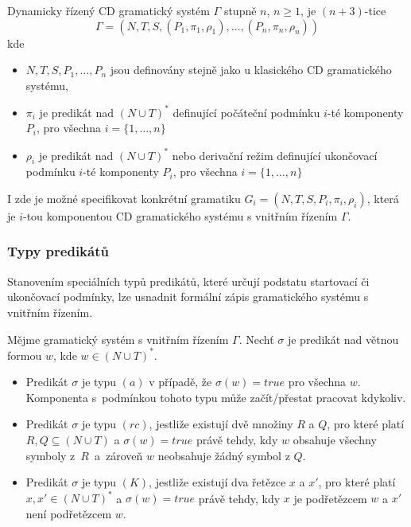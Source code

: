 \begin{definice} \label{defGSVnitrniRizeni}
  Dynamicky řízený CD gramatický systém $\Gamma$ stupně $n$, $n \geq 1$, je $(n+3)$-tice
  $$\Gamma = (N, T, S, (P_1, \pi_1, \rho_1), \dots, (P_n, \pi_n, \rho_n))$$ kde
  \begin{itemize}
    \item $N, T, S, P_1, \dots, P_n$ jsou definovány stejně jako u klasického CD gramatického systému,
    \item $\pi_i$ je predikát nad $(N \cup T)^*$ definující počáteční podmínku $i$-té komponenty $P_i$, pro všechna $i = \{1, \dots, n\}$
    \item $\rho_i$ je predikát nad $(N \cup T)^*$ nebo derivační režim definující ukončovací podmínku $i$-té komponenty $P_i$, pro všechna $i = \{1, \dots, n\}$
  \end{itemize}
\end{definice}

I zde je možné specifikovat konkrétní gramatiku $G_i = (N, T, S, P_i, \pi_i, \rho_i)$, která je $i$-tou komponentou CD gramatického systému s vnitřním řízením  $\Gamma$.

\subsubsection*{Typy predikátů}
Stanovením speciálních typů predikátů, které určují podstatu startovací či ukončovací podmínky, lze usnadnit formální zápis gramatického systému s vnitřním řízením.
\begin{definice}
  Mějme gramatický systém s vnitřním řízením $\Gamma$. Nechť $\sigma$ je predikát nad větnou formou $w$, kde
  $w \in (N \cup T)^*$.
  \begin{itemize}
    \item Predikát $\sigma$ je typu $(a)$ v případě, že $\sigma(w) = true$ pro všechna $w$. Komponenta s~podmínkou tohoto typu může začít/přestat pracovat kdykoliv.
    \item Predikát $\sigma$ je typu $(rc)$, jestliže existují dvě množiny $R$ a $Q$, pro které platí \linebreak $R, Q \subseteq (N \cup T)$ a $\sigma(w) = true$ právě tehdy, kdy
          $w$ obsahuje všechny symboly z~$R$~a~zároveň $w$ neobsahuje žádný symbol z $Q$.
    \item Predikát $\sigma$ je typu $(K)$, jestliže existují dva řetězce $x$ a $x'$, pro které platí \linebreak $x, x' \in (N \cup T)^*$ a $\sigma(w) = true$ právě tehdy, kdy
          $x$ je podřetězcem $w$ a $x'$ není podřetězcem $w$.
  \end{itemize}
\end{definice}

